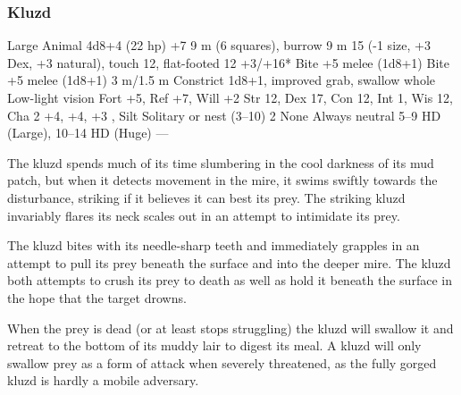 \subsubsection{Kluzd}
\begin{MonsterStats}
{Large Animal}
{4d8+4 (22 hp)}
{+7}
{9 m (6 squares), burrow 9 m}
{15 (-1 size, +3 Dex, +3 natural), touch 12, flat-footed 12}
{+3/+16*}
{Bite +5 melee (1d8+1)}
{Bite +5 melee (1d8+1)}
{3 m/1.5 m}
{Constrict 1d8+1, improved grab, swallow whole}
{Low-light vision}
{Fort +5, Ref +7, Will +2}
{Str 12, Dex 17, Con 12, Int 1, Wis 12, Cha 2}
{ +4,  +4,  +3}
{, }
{Silt}
{Solitary or nest (3--10)}
{2}
{None}
{Always neutral}
{5--9 HD (Large), 10--14 HD (Huge)}
{---}
\end{MonsterStats}


The kluzd spends much of its time slumbering in the cool darkness of its mud patch, but when it detects movement in the mire, it swims swiftly towards the disturbance, striking if it believes it can best its prey. The striking kluzd invariably flares its neck scales out in an attempt to intimidate its prey.

The kluzd bites with its needle-sharp teeth and immediately grapples in an attempt to pull its prey beneath the surface and into the deeper mire. The kluzd both attempts to crush its prey to death as well as hold it beneath the surface in the hope that the target drowns.

When the prey is dead (or at least stops struggling) the kluzd will swallow it and retreat to the bottom of its muddy lair to digest its meal. A kluzd will only swallow prey as a form of attack when severely threatened, as the fully gorged kluzd is hardly a mobile adversary.

